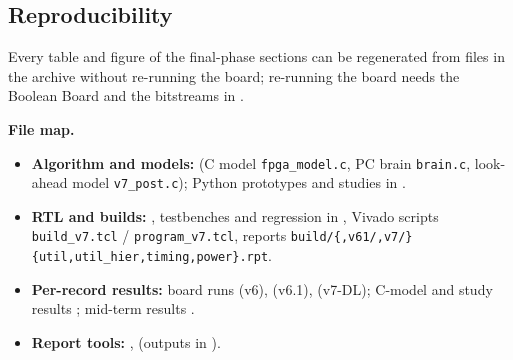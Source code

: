 
\begin{finalpart}
\section{Reproducibility}
\label{sec:repro}
Every table and figure of the final-phase sections can be regenerated from files in the archive without re-running the board; re-running the board needs the Boolean Board and the bitstreams in .

\noindent\textbf{File map.}
\begin{itemize}
    \item \textbf{Algorithm and models:}  (C model \texttt{fpga\_model.c}, PC brain \texttt{brain.c}, look-ahead model \texttt{v7\_post.c}); Python prototypes and studies in .
    \item \textbf{RTL and builds:} , testbenches and regression in , Vivado scripts \texttt{build\_v7.tcl} / \texttt{program\_v7.tcl}, reports \texttt{build/\{,v61/,v7/\}\{util,util\_hier,timing,power\}.rpt}.
    \item \textbf{Per-record results:} board runs  (v6),  (v6.1),  (v7-DL); C-model and study results ; mid-term results .
    \item \textbf{Report tools:} ,  (outputs in ).
\end{itemize}


\end{finalpart}
